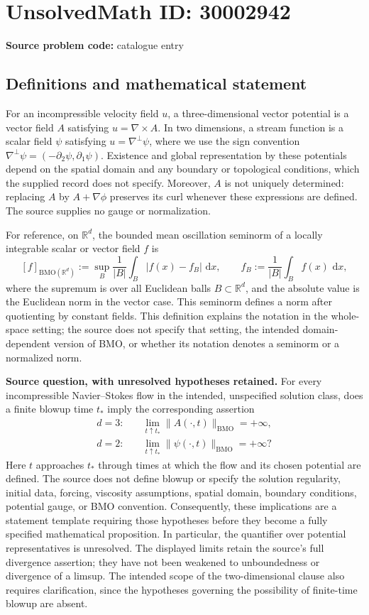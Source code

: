 \documentclass[11pt]{article}
\newcommand{\R}{\mathbb{R}}
\newcommand{\dd}{\,\mathrm{d}}
\begin{document}
\section*{UnsolvedMath ID: 30002942}
\textbf{Source problem code:} catalogue entry
\subsection{Definitions and mathematical statement}
For an incompressible velocity field \(u\), a three-dimensional vector potential is a vector field \(A\) satisfying \(u=\nabla\times A\). In two dimensions, a stream function is a scalar field \(\psi\) satisfying \(u=\nabla^\perp\psi\), where we use the sign convention \(\nabla^\perp\psi=(-\partial_2\psi,\partial_1\psi)\). Existence and global representation by these potentials depend on the spatial domain and any boundary or topological conditions, which the supplied record does not specify. Moreover, \(A\) is not uniquely determined: replacing \(A\) by \(A+\nabla\phi\) preserves its curl whenever these expressions are defined. The source supplies no gauge or normalization.

For reference, on \(\R^d\), the bounded mean oscillation seminorm of a locally integrable scalar or vector field \(f\) is
\[
 [f]_{\mathrm{BMO}(\R^d)}
 :=\sup_B\frac{1}{|B|}\int_B|f(x)-f_B|\,\dd x,
 \qquad f_B:=\frac{1}{|B|}\int_B f(x)\,\dd x,
\]
where the supremum is over all Euclidean balls \(B\subset\R^d\), and the absolute value is the Euclidean norm in the vector case. This seminorm defines a norm after quotienting by constant fields. This definition explains the notation in the whole-space setting; the source does not specify that setting, the intended domain-dependent version of BMO, or whether its notation denotes a seminorm or a normalized norm.

\textbf{Source question, with unresolved hypotheses retained.} For every incompressible Navier--Stokes flow in the intended, unspecified solution class, does a finite blowup time \(t_*\) imply the corresponding assertion
\[
\begin{aligned}
 d=3:\quad &\lim_{t\uparrow t_*}\|A(\cdot,t)\|_{\mathrm{BMO}}=+\infty,\\
 d=2:\quad &\lim_{t\uparrow t_*}\|\psi(\cdot,t)\|_{\mathrm{BMO}}=+\infty?
\end{aligned}
\]
Here \(t\) approaches \(t_*\) through times at which the flow and its chosen potential are defined. The source does not define blowup or specify the solution regularity, initial data, forcing, viscosity assumptions, spatial domain, boundary conditions, potential gauge, or BMO convention. Consequently, these implications are a statement template requiring those hypotheses before they become a fully specified mathematical proposition. In particular, the quantifier over potential representatives is unresolved. The displayed limits retain the source's full divergence assertion; they have not been weakened to unboundedness or divergence of a limsup. The intended scope of the two-dimensional clause also requires clarification, since the hypotheses governing the possibility of finite-time blowup are absent.
\end{document}
